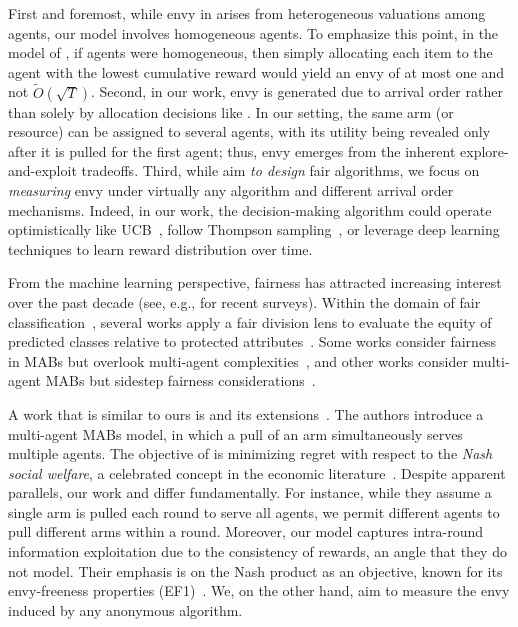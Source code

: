 First and foremost, while envy in \citet{benade2018make} arises from heterogeneous valuations among agents, our model involves homogeneous agents. To emphasize this point, in the model of  \citet{benade2018make}, if agents were homogeneous, then simply allocating each item to the agent with the lowest cumulative reward would yield an envy of at most one and not $\tilde O(\sqrt{T})$. Second, in our work, envy is generated due to arrival order rather than solely by allocation decisions like \citet{benade2018make}. In our setting, the same arm (or resource) can be assigned to several agents, with its utility being revealed only after it is pulled for the first agent; thus, envy emerges from the inherent explore-and-exploit tradeoffs. Third, while \citet{benade2018make} aim \emph{to design} fair algorithms, we focus on \emph{measuring} envy under virtually any algorithm and different arrival order mechanisms. Indeed, in our work, the decision-making algorithm could operate optimistically like UCB~\cite{auer2002finite}, follow Thompson sampling~\cite{agrawal2012analysis}, or leverage deep learning techniques to learn reward distribution over time. %


From the machine learning perspective, fairness has attracted increasing interest over the past decade (see, e.g., \cite{Mehrabi19,caton2020fairness,pessach2022review} for recent surveys).
Within the domain of fair classification~\cite{Kleinberg16}, several works apply a fair division lens to evaluate the equity of predicted classes relative to protected attributes~\cite{Hossain20-2, ben2021protecting}. Some works consider fairness in MABs but overlook multi-agent complexities~\cite{wang2021fairness,liu2017calibrated}, and other works consider multi-agent MABs but sidestep fairness considerations~\cite{chakraborty2017coordinated,bargiacchi2018learning}. 

A work that is similar to ours is \citet{Hossain20} and its extensions~\cite{jones2023efficient}.
The authors introduce a multi-agent MABs model, in which a pull of an arm simultaneously serves multiple agents.
The objective of \cite{Hossain20} is minimizing regret with respect to the \textit{Nash social welfare}, a celebrated concept in the economic literature~\cite{kaneko1979nash}. Despite apparent parallels, our work and \cite{Hossain20} differ fundamentally.
For instance, while they assume a single arm is pulled each round to serve all agents, we permit different agents to pull different arms within a round.
Moreover, our model captures intra-round information exploitation due to the consistency of rewards, an angle that they do not model.
Their emphasis is on the Nash product as an objective, known for its envy-freeness properties (EF1)~\cite{caragiannis2019unreasonable}. We, on the other hand, aim to measure the envy induced by any anonymous algorithm.

